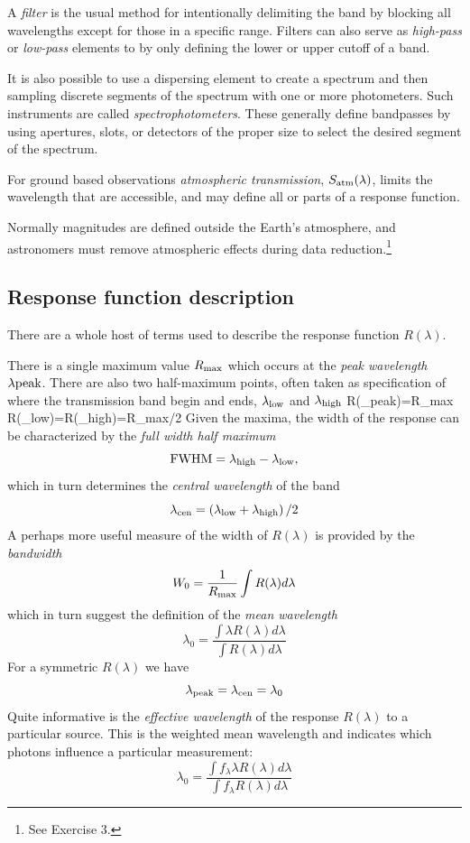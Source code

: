 A {\it filter} is the usual method for intentionally delimiting the
band by blocking all wavelengths except for those in a specific
range. Filters can also serve as {\it high-pass} or {\it low-pass}
elements to by only defining the lower or upper cutoff of a band.

It is also possible to use a dispersing element to create a spectrum
and then sampling discrete segments of the spectrum with one or more
photometers. Such instruments are called {\it
  spectrophotometers}. These generally define bandpasses by using
apertures, slots, or detectors of the proper size to select the
desired segment of the spectrum. 

For ground based observations {\it atmospheric transmission}, $S_{\rm
  atm}(\lambda)$, limits the wavelength that are accessible, and may
define all or parts of a response function. 

Normally magnitudes are defined outside the Earth's atmosphere, and
astronomers must remove atmospheric effects during data reduction.\footnote{See Exercise 3.}

\subsection{Response function description}

There are a whole host of terms used to describe the response
function $R(\lambda)$. 

There is a single maximum value $R_{\rm max}$  which occurs at the
{\it peak wavelength} $\lambda{\rm peak}$. There are also two
half-maximum points, often taken as specification of where the
transmission band begin and ends, $\lambda_{\rm low}$ and
$\lambda_{\rm high}$
\bua
R(\lambda_{\rm peak})=R_{\rm max} \\
R(\lambda_{\rm low})=R(\lambda_{\rm high})={R_{\rm max}/2}
\eua
Given the maxima, the width of the response can be characterized by
the {\it full width half maximum}
\[
{\rm FWHM}=\lambda_{\rm high}-\lambda_{\rm low},
\]
which in turn determines the {\it central wavelength} of the band
\[
\lambda_{\rm cen}={\left(\lambda_{\rm low}+\lambda_{\rm
      high}\right)/2}
\]
A perhaps more useful measure of the width of $R(\lambda)$ is provided
by the {\it bandwidth}
\[
W_0=\frac{1}{R_{\rm max}}\int R(\lambda)d\lambda
\]
which in turn suggest the definition of the {\it mean wavelength}
\[
\lambda_0=\frac{\int\lambda R(\lambda)d\lambda}{\int
  R(\lambda)d\lambda}
\]
For a symmetric $R(\lambda)$ we have
\[
\lambda_{\rm peak}=\lambda_{\rm cen}=\lambda_0
\]
Quite informative is the {\it effective wavelength} of the response
$R(\lambda)$ to a particular source. This is the weighted mean
wavelength and indicates which photons influence a particular
measurement:
\[
\lambda_0=\frac{\int f_\lambda\lambda R(\lambda)d\lambda}{\int
  f_\lambda R(\lambda)d\lambda}
\]

